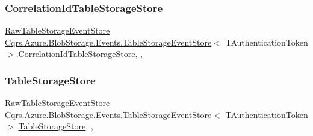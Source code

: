 \subsubsection{\texorpdfstring{Correlation\+Id\+Table\+Storage\+Store}{CorrelationIdTableStorageStore}}
{\footnotesize\ttfamily \hyperlink{classCqrs_1_1Azure_1_1BlobStorage_1_1Events_1_1TableStorageEventStore_1_1RawTableStorageEventStore}{Raw\+Table\+Storage\+Event\+Store} \hyperlink{classCqrs_1_1Azure_1_1BlobStorage_1_1Events_1_1TableStorageEventStore}{Cqrs.\+Azure.\+Blob\+Storage.\+Events.\+Table\+Storage\+Event\+Store}$<$ T\+Authentication\+Token $>$.Correlation\+Id\+Table\+Storage\+Store\hspace{0.3cm}{\ttfamily [get]}, {\ttfamily [set]}, {\ttfamily [protected]}}

\mbox{\label{classCqrs_1_1Azure_1_1BlobStorage_1_1Events_1_1TableStorageEventStore_ad86c24c28321c16b1f3601b3e7d870c4_ad86c24c28321c16b1f3601b3e7d870c4}} 
\subsubsection{\texorpdfstring{Table\+Storage\+Store}{TableStorageStore}}
{\footnotesize\ttfamily \hyperlink{classCqrs_1_1Azure_1_1BlobStorage_1_1Events_1_1TableStorageEventStore_1_1RawTableStorageEventStore}{Raw\+Table\+Storage\+Event\+Store} \hyperlink{classCqrs_1_1Azure_1_1BlobStorage_1_1Events_1_1TableStorageEventStore}{Cqrs.\+Azure.\+Blob\+Storage.\+Events.\+Table\+Storage\+Event\+Store}$<$ T\+Authentication\+Token $>$.\hyperlink{classCqrs_1_1Azure_1_1BlobStorage_1_1TableStorageStore}{Table\+Storage\+Store}\hspace{0.3cm}{\ttfamily [get]}, {\ttfamily [set]}, {\ttfamily [protected]}}

